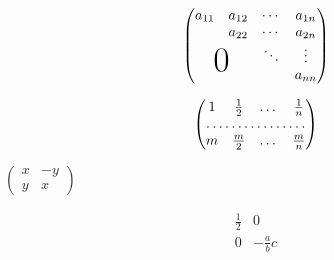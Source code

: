 \documentclass{ctexart}
\begin{document}
    \[
    \begin{pmatrix}
        a_{11} & a_{12} & \cdots & a_{1n}   \\
               & a_{22} & \cdots & a_{2n}    \\
                &       & \ddots & \vdots   \\
                \multicolumn{2}{c}{\raisebox{1.3ex}[0pt]{\Huge 0}} &   & a_{nn}      
    \end{pmatrix}
    \]

    \[
    \begin{pmatrix}
        1 & \frac 12 & \dots & \frac 1n \\
        \hdotsfor{4}    \\
        m & \frac m2 & \dots & \frac mn
    \end{pmatrix}
    \]

    \begin{math}
    \left( %
        \begin{smallmatrix}
            x & -y \\ y & x
        \end{smallmatrix}
    \right)
    \end{math}

    \[
    \begin{array}{r|c}
        \frac 12 & 0 \\
        \hline
        0 & -\frac abc \\
    \end{array}
    \]
\end{document}
